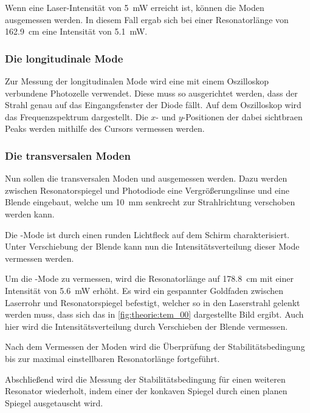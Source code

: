     Wenn eine Laser-Intensität von \SI{5}{\milli\watt} erreicht ist,
    können die Moden ausgemessen werden.
    In diesem Fall ergab sich bei einer Resonatorlänge von \SI{162.9}{\centi\meter} eine Intensität von \SI{5.1}{\milli\watt}.


\subsubsection{Die longitudinale Mode}

    Zur Messung der longitudinalen Mode wird eine mit einem Oszilloskop verbundene Photozelle verwendet.
    Diese muss so ausgerichtet werden,
    dass der Strahl genau auf das Eingangsfenster der Diode fällt.
    Auf dem Oszilloskop wird das Frequenzspektrum dargestellt.
    Die $x$- und $y$-Positionen der dabei sichtbraen Peaks
    werden mithilfe des Cursors vermessen werden.


\subsubsection{Die transversalen Moden}

    Nun sollen die transversalen Moden  und  ausgemessen werden.
    Dazu werden zwischen Resonatorspiegel und Photodiode eine Vergrößerungslinse und eine Blende eingebaut,
    welche um \SI{10}{\milli\meter} senkrecht zur Strahlrichtung verschoben werden kann.

    Die -Mode ist durch einen runden Lichtfleck auf dem Schirm charakterisiert.
    Unter Verschiebung der Blende kann nun die Intensitätsverteilung dieser Mode vermessen werden.

    Um die -Mode zu vermessen,
    wird die Resonatorlänge auf \SI{178.8}{\centi\meter} mit einer Intensität von \SI{5.6}{\milli\watt} erhöht.
    Es wird ein gespannter Goldfaden zwischen Laserrohr und Resonatorspiegel befestigt,
    welcher so in den Laserstrahl gelenkt werden muss,
    dass sich das in \autoref{fig:theorie:tem_00} dargestellte Bild ergibt.
    Auch hier wird die Intensitätsverteilung durch Verschieben der Blende vermessen.


    Nach dem Vermessen der Moden wird die Überprüfung der Stabilitätsbedingung bis zur maximal einstellbaren Resonatorlänge fortgeführt.

    Abschließend wird die Messung der Stabilitätsbedingung für einen weiteren Resonator wiederholt,
    indem einer der konkaven Spiegel durch einen planen Spiegel ausgetauscht wird.
